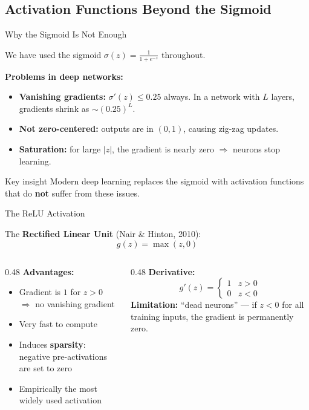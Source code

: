 \documentclass[11pt,aspectratio=169,professionalfonts]{beamer}
\begin{document}
\subsection{Activation Functions Beyond the Sigmoid}
%
\begin{frame}{Why the Sigmoid Is Not Enough}

We have used the sigmoid $\sigma(z) = \frac{1}{1+e^{-z}}$ throughout.

\medskip
\textbf{Problems in deep networks:}
\begin{itemize}
    \item \textbf{Vanishing gradients:} $\sigma'(z) \leq 0.25$ always. In a network with $L$ layers, gradients shrink as $\sim (0.25)^L$.
    \item \textbf{Not zero-centered:} outputs are in $(0,1)$, causing zig-zag updates.
    \item \textbf{Saturation:} for large $|z|$, the gradient is nearly zero $\Rightarrow$ neurons stop learning.
\end{itemize}

\vspace{0.3cm}
\begin{alertblock}{Key insight}
Modern deep learning replaces the sigmoid with activation functions that do \textbf{not} suffer from these issues.
\end{alertblock}
\end{frame}
%
%
\begin{frame}{The ReLU Activation}

The \textbf{Rectified Linear Unit} (Nair \& Hinton, 2010):
\[
g(z) = \max(z, 0)
\]

\begin{columns}
\begin{column}{0.48\textwidth}
\textbf{Advantages:}
\begin{itemize}
    \item Gradient is $1$ for $z>0$ $\Rightarrow$ no vanishing gradient
    \item Very fast to compute
    \item Induces \textbf{sparsity}: negative pre-activations are set to zero
    \item Empirically the most widely used activation
\end{itemize}
\end{column}
\begin{column}{0.48\textwidth}
\textbf{Derivative:}
\[
g'(z) = \begin{cases} 1 & z > 0 \\ 0 & z < 0 \end{cases}
\]
\textbf{Limitation:} ``dead neurons'' --- if $z < 0$ for all training inputs, the gradient is permanently zero.
\end{column}
\end{columns}

\end{frame}
\end{document}
